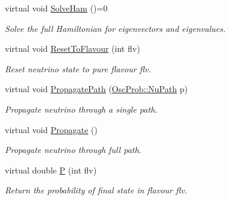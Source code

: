 \begin{DoxyCompactItemize}
virtual void \hyperlink{classOscProb_1_1PMNS__Base_a91f065cb9e910e0095e41462b4420b01}{Solve\+Ham} ()=0
\begin{DoxyCompactList}\small\item\em Solve the full Hamiltonian for eigenvectors and eigenvalues. \end{DoxyCompactList}\item 
virtual void \hyperlink{classOscProb_1_1PMNS__Base_ac0d4bf8ff1318ef96d3dafa62e0cec25}{Reset\+To\+Flavour} (int flv)
\begin{DoxyCompactList}\small\item\em Reset neutrino state to pure flavour flv. \end{DoxyCompactList}\item 
virtual void \hyperlink{classOscProb_1_1PMNS__Base_accb08503acc162188041d7a96a280462}{Propagate\+Path} (\hyperlink{structOscProb_1_1NuPath}{Osc\+Prob\+::\+Nu\+Path} p)
\begin{DoxyCompactList}\small\item\em Propagate neutrino through a single path. \end{DoxyCompactList}\item 
virtual void \hyperlink{classOscProb_1_1PMNS__Base_a054e3a8b05b9a958b6fa416e4a835e3e}{Propagate} ()
\begin{DoxyCompactList}\small\item\em Propagate neutrino through full path. \end{DoxyCompactList}\item 
virtual double \hyperlink{classOscProb_1_1PMNS__Base_a0dc4d45bc3d7e03b9abbf5b4e100cc22}{P} (int flv)
\begin{DoxyCompactList}\small\item\em Return the probability of final state in flavour flv. \end{DoxyCompactList}\end{DoxyCompactItemize}
